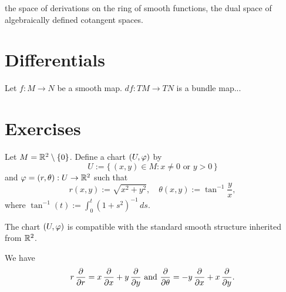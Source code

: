 \documentclass{../../large}
\begin{document}
\begin{prb}
\end{prb}
\begin{prb}
\end{prb}
the space of derivations on the ring of smooth functions,
the dual space of algebraically defined cotangent spaces.



\begin{prb}

\end{prb}








\section{Differentials}

\begin{prb}
Let $f:M\to N$ be a smooth map.
$df:TM\to TN$ is a bundle map...
\end{prb}






\section{}


\section*{Exercises}
\setcounter{prb}{0}
\begin{prb}
Let $M=\mathbb{R}^2\setminus\{0\}$.
Define a chart $(U,\varphi)$ by
\[U:=\{\,(x,y)\in M:x\ne0\text{ or }y>0\,\}\]
and $\varphi=(r,\theta):U\to\mathbb{R}^2$ such that
\[r(x,y):=\sqrt{x^2+y^2},\quad\theta(x,y):=\tan^{-1}\frac yx,\]
where $\tan^{-1}(t):=\int_0^t(1+s^2)^{-1}\,ds$.
\begin{parts}
\item The chart $(U,\varphi)$ is compatible with the standard smooth structure inherited from $\mathbb{R}^2$.
\item We have
\[r\,\pd{r}=x\,\pd{x}+y\,\pd{y}\text{ and }\pd{\theta}=-y\,\pd{x}+x\,\pd{y}.\]
\end{parts}
\end{prb}
\end{document}
